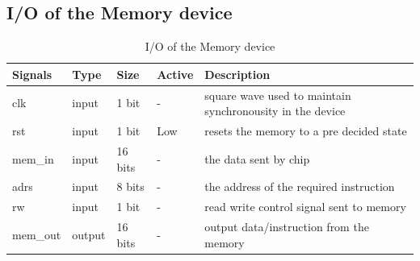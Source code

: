 \documentclass[11pt]{article}
\begin{document}
\subsection{I/O of the  Memory device}

\begin{table}[H]
  \begin{center}
    \caption{I/O of the Memory device}
    \begin{tabularx}{\linewidth}{||l|l|l|l|X||}
      \hline
      {\bf Signals} & { \bf Type } & {\bf Size} & {\bf Active} &{\bf Description}   \\ \hline
            clk            & input  & 1 bit   & -     &  square wave used to maintain synchronousity in the device \\ \hline
            rst            & input  & 1 bit   & Low   &  resets the memory to a pre decided state \\ \hline
            [15:0] mem\_in & input  & 16 bits & -     &  the data sent by chip \\ \hline
            [7:0] adrs     & input  & 8 bits  & -     &  the address of the required instruction \\ \hline
            rw             & input  & 1 bit   & -     &  read write control signal sent to memory \\ \hline
            [15:0] mem\_out& output & 16 bits & -     &  output data/instruction from the memory \\ \hline
    \end{tabularx}
  \end{center}
\end{table}
\end{document}
